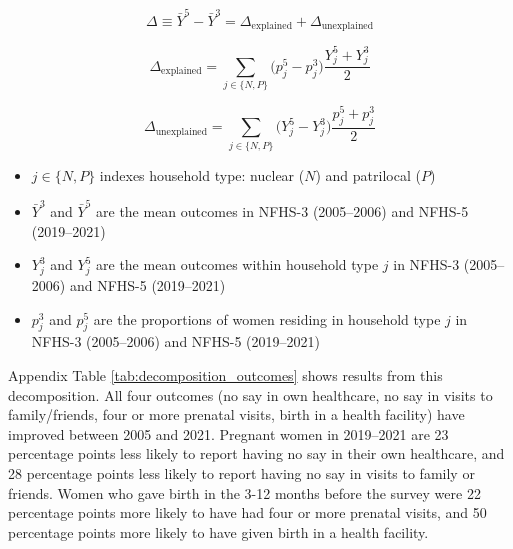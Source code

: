 \documentclass[10pt,twoside,reqno]{article}
\begin{document}
\begin{equation}
\Delta \equiv \bar Y^{5} - \bar Y^{3}
= \Delta_{\text{explained}} + \Delta_{\text{unexplained}}
\end{equation}

\begin{equation}
\Delta_{\text{explained}} =
\sum_{j \in \{N,P\}} \big(p_j^{5} - p_j^{3}\big)\frac{Y_j^{5} + Y_j^{3}}{2}
\end{equation}

\begin{equation}
\Delta_{\text{unexplained}} =
\sum_{j \in \{N,P\}} \big(Y_j^{5} - Y_j^{3}\big)\frac{p_j^{5} + p_j^{3}}{2}
\end{equation}

\begin{itemize}
    \item $j \in \{N,P\}$ indexes household type: nuclear ($N$) and patrilocal ($P$)
    \item $\bar Y^{3}$ and $\bar Y^{5}$ are the mean outcomes in NFHS-3 (2005--2006) and NFHS-5 (2019--2021)
    \item $Y_j^{3}$ and $Y_j^{5}$ are the mean outcomes within household type $j$ in NFHS-3 (2005--2006) and NFHS-5 (2019--2021)
    \item $p_j^{3}$ and $p_j^{5}$ are the proportions of women residing in household type $j$ in NFHS-3 (2005--2006) and NFHS-5 (2019--2021)
\end{itemize}


Appendix Table \ref{tab:decomposition_outcomes} shows results from this decomposition. All four outcomes (no say in own healthcare, no say in visits to family/friends, four or more prenatal visits, birth in a health facility) have improved between 2005 and 2021. Pregnant women in 2019--2021 are 23 percentage points less likely to report having no say in their own healthcare, and 28 percentage points less likely to report having no say in visits to family or friends. Women who gave birth in the 3-12 months before the survey were 22 percentage points more likely to have had four or more prenatal visits, and 50 percentage points more likely to have given birth in a health facility. 
\end{document}
